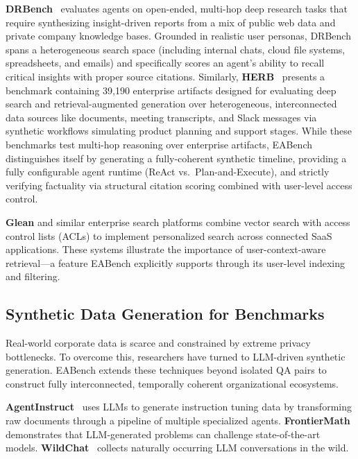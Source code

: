 \documentclass[journal,dvipsnames]{acmart}
\begin{document}
\textbf{DRBench}~\cite{abaskohi2025drbench} evaluates agents on open-ended, multi-hop deep research tasks that require synthesizing insight-driven reports from a mix of public web data and private company knowledge bases. Grounded in realistic user personas, DRBench spans a heterogeneous search space (including internal chats, cloud file systems, spreadsheets, and emails) and specifically scores an agent's ability to recall critical insights with proper source citations. 
    Similarly, \textbf{HERB}~\cite{choubey2025benchmarking} presents a benchmark containing 39,190 enterprise artifacts designed for evaluating deep search and retrieval-augmented generation over heterogeneous, interconnected data sources like documents, meeting transcripts, and Slack messages via synthetic workflows simulating product planning and support stages. While these benchmarks test multi-hop reasoning over enterprise artifacts, EABench distinguishes itself by generating a fully-coherent synthetic timeline, providing a fully configurable agent runtime (ReAct vs.\ Plan-and-Execute), and strictly verifying factuality via structural citation scoring combined with user-level access control.

\textbf{Glean} and similar enterprise search platforms combine vector search
with access control lists (ACLs) to implement personalized search across
connected SaaS applications.  These systems illustrate the importance of
user-context-aware retrieval---a feature EABench explicitly supports through
its user-level indexing and filtering.

\subsection{Synthetic Data Generation for Benchmarks}

Real-world corporate data is scarce and constrained by extreme privacy bottlenecks. To overcome this, researchers have turned to LLM-driven synthetic generation. EABench extends these techniques beyond isolated QA pairs to construct fully interconnected, temporally coherent organizational ecosystems.

\textbf{AgentInstruct}~\cite{mitra2024agentinstruct} uses LLMs to generate
instruction tuning data by transforming raw documents through a pipeline of
multiple specialized agents.
\textbf{FrontierMath}~\cite{glazer2024frontiermath} demonstrates that
LLM-generated problems can challenge state-of-the-art models.
\textbf{WildChat}~\cite{zhao2024wildchat} collects naturally occurring LLM
conversations in the wild.
\end{document}
